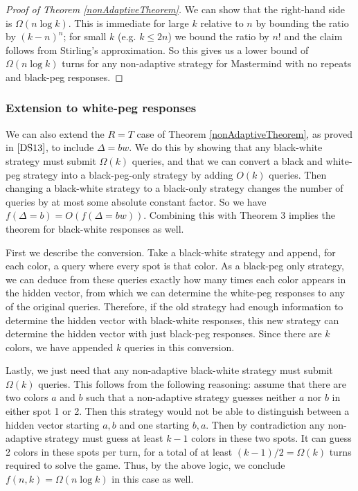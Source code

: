 \documentclass[12pt, a4paper]{article}
\begin{document}
\begin{proof}[Proof of Theorem \ref{nonAdaptiveTheorem}]
	We can show that the right-hand side is $\Omega(n\log k)$. This is immediate for large $k$ relative to $n$ by bounding the ratio by $(k-n)^n$; for small $k$ (e.g. $k \leq 2n$) we bound the ratio by $n!$ and the claim follows from Stirling's approximation. So this gives us a lower bound of $\Omega(n \log k)$ turns for any non-adaptive strategy for Mastermind with no repeats and black-peg responses.
\end{proof}
\subsubsection{Extension to white-peg responses}
We can also extend the $R=T$ case of Theorem \ref{nonAdaptiveTheorem}, as proved in $\cite{DS13}$, to include $\Delta = bw$. We do this by showing that any black-white strategy must submit $\Omega(k)$ queries, and that we can convert a black and white-peg strategy into a black-peg-only strategy by adding $O(k)$ queries. 
Then changing a black-white strategy to a black-only strategy changes the number of queries by at most some absolute constant factor. So we have $f(\Delta = b) = O(f(\Delta = bw))$. Combining this with Theorem 3 implies the theorem for black-white responses as well.

First we describe the conversion. Take a black-white strategy and append, for each color, a query where every spot is that color. As a black-peg only strategy, we can deduce from these queries exactly how many times each color appears in the hidden vector, from which we can determine the white-peg responses to any of the original queries. Therefore, if the old strategy had enough information to determine the hidden vector with black-white responses, this new strategy can determine the hidden vector with just black-peg responses. Since there are $k$ colors, we have appended $k$ queries in this conversion. 

Lastly, we just need that any non-adaptive black-white strategy must submit $\Omega(k)$ queries. This follows from the following reasoning: assume that there are two colors $a$ and $b$ such that a non-adaptive strategy guesses neither $a$ nor $b$ in either spot 1 or 2. Then this strategy would not be able to distinguish between a hidden vector starting $a,b$ and one starting $b,a$. Then by contradiction any non-adaptive strategy must guess at least $k-1$ colors in these two spots. It can guess 2 colors in these spots per turn, for a total of at least $(k-1)/2 = \Omega(k)$ turns required to solve the game. Thus, by the above logic, we conclude $f(n,k) = \Omega(n \log k)$ in this case as well.
\end{document}
